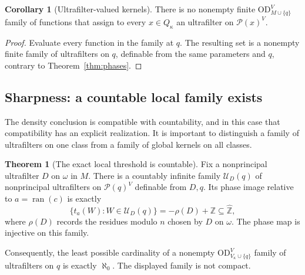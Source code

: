 \documentclass[11pt,letterpaper]{article}
\theoremstyle{definition}
\newtheorem{theorem}[definition]{Theorem}
\newtheorem{corollary}[definition]{Corollary}
\numberwithin{equation}{section}
\newcommand{\OD}{\mathrm{OD}}
\newcommand{\ran}{\operatorname{ran}}
\newcommand{\ZZ}{\mathbb Z}
\newcommand{\zhat}{\widehat{\mathbb Z}}
\newcommand{\ODg}{\OD_{M\cup\{q\}}^{V}}
\newcommand{\ODlow}{\OD_{V_\kappa\cup\{q\}}^{V}}
\newcommand{\powerset}{\mathcal P}
\begin{document}
\begin{corollary}[Ultrafilter-valued kernels]\label{cor:ufkernels}
There is no nonempty finite $\ODg$ family of functions that assign to
every $x\in Q_\kappa$ an ultrafilter on $\powerset(x)^V$.
\end{corollary}

\begin{proof}
Evaluate every function in the family at $q$. The resulting set is a
nonempty finite family of ultrafilters on $q$, definable from the same
parameters and $q$, contrary to Theorem~\ref{thm:phases}.
\end{proof}

\subsection{Sharpness: a countable local family exists}

The density conclusion is compatible with countability, and in this case
that compatibility has an explicit realization. It is important to
distinguish a family of ultrafilters on one class from a family of global
kernels on all classes.

\begin{theorem}[The exact local threshold is countable]\label{thm:countable}
Fix a nonprincipal ultrafilter $D$ on $\omega$ in $M$. There is a countably
infinite family $\mathcal U_D(q)$ of nonprincipal ultrafilters on
$\powerset(q)^V$ definable from $D,q$. Its phase image relative to
$a=\ran(c)$ is exactly
\[
 \{t_a(W):W\in\mathcal U_D(q)\}=-\rho(D)+\ZZ\subseteq\zhat,
\]
where $\rho(D)$ records the residues modulo $n$ chosen by $D$ on $\omega$.
The phase map is injective on this family.

Consequently, the least possible cardinality of a nonempty
$\ODlow$ family of ultrafilters on $q$ is exactly $\aleph_0$.
The displayed family is not compact.
\end{theorem}
\end{document}
